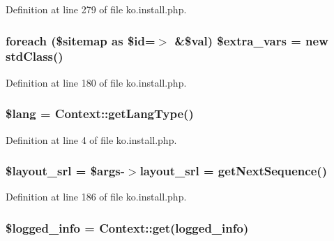 Definition at line 279 of file ko.\+install.\+php.

\hypertarget{ko_8install_8php_a99863a9d4b597491e1a9c801f2e55c0b}{}
\subsubsection[{\$extra\+\_\+vars}]{\setlength{\rightskip}{0pt plus 5cm}foreach (\$sitemap as \$id=$>$ \&\$val) \${\bf extra\+\_\+vars} = new std\+Class()}\label{ko_8install_8php_a99863a9d4b597491e1a9c801f2e55c0b}


Definition at line 180 of file ko.\+install.\+php.

\hypertarget{ko_8install_8php_a7714b111b644017933931ec69a154102}{}
\subsubsection[{\$lang}]{\setlength{\rightskip}{0pt plus 5cm}\$lang = {\bf Context\+::get\+Lang\+Type}()}\label{ko_8install_8php_a7714b111b644017933931ec69a154102}


Definition at line 4 of file ko.\+install.\+php.

\hypertarget{ko_8install_8php_a77889723c4aa360089caae223118d413}{}
\subsubsection[{\$layout\+\_\+srl}]{\setlength{\rightskip}{0pt plus 5cm}\${\bf layout\+\_\+srl} = \$args-\/$>${\bf layout\+\_\+srl} = {\bf get\+Next\+Sequence}()}\label{ko_8install_8php_a77889723c4aa360089caae223118d413}


Definition at line 186 of file ko.\+install.\+php.

\hypertarget{ko_8install_8php_a193c1593ceb216e9fb05b0bad01ebbc8}{}
\subsubsection[{\$logged\+\_\+info}]{\setlength{\rightskip}{0pt plus 5cm}\$logged\+\_\+info = {\bf Context\+::get}(\textquotesingle{}logged\+\_\+info\textquotesingle{})}\label{ko_8install_8php_a193c1593ceb216e9fb05b0bad01ebbc8}


